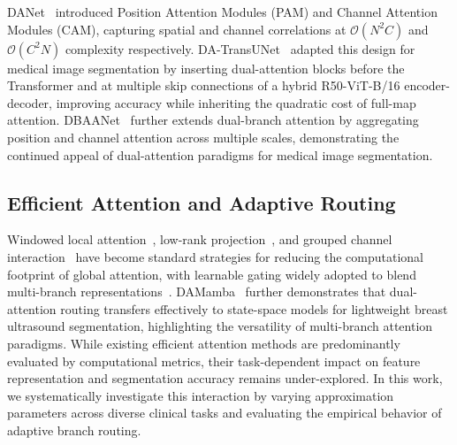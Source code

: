DANet~\cite{fu2019dual} introduced Position Attention Modules (PAM) and Channel Attention Modules (CAM), capturing spatial and channel correlations at $\mathcal{O}(N^2C)$ and $\mathcal{O}(C^2N)$ complexity respectively. DA-TransUNet~\cite{sun2024datransunet} adapted this design for medical image segmentation by inserting dual-attention blocks before the Transformer and at multiple skip connections of a hybrid R50-ViT-B/16 encoder-decoder, improving accuracy while inheriting the quadratic cost of full-map attention. DBAANet~\cite{li2025dbaanet} further extends dual-branch attention by aggregating position and channel attention across multiple scales, demonstrating the continued appeal of dual-attention paradigms for medical image segmentation.

\subsection{Efficient Attention and Adaptive Routing}

Windowed local attention~\cite{liu2021swin}, low-rank projection~\cite{wang2020linformer}, and grouped channel interaction~\cite{rahman2024emcad} have become standard strategies for reducing the computational footprint of global attention, with learnable gating widely adopted to blend multi-branch representations~\cite{azad2023daeformer,rahman2024emcad}. DAMamba~\cite{ding2025damamba} further demonstrates that dual-attention routing transfers effectively to state-space models for lightweight breast ultrasound segmentation, highlighting the versatility of multi-branch attention paradigms. While existing efficient attention methods are predominantly evaluated by computational metrics, their task-dependent impact on feature representation and segmentation accuracy remains under-explored. In this work, we systematically investigate this interaction by varying approximation parameters across diverse clinical tasks and evaluating the empirical behavior of adaptive branch routing.